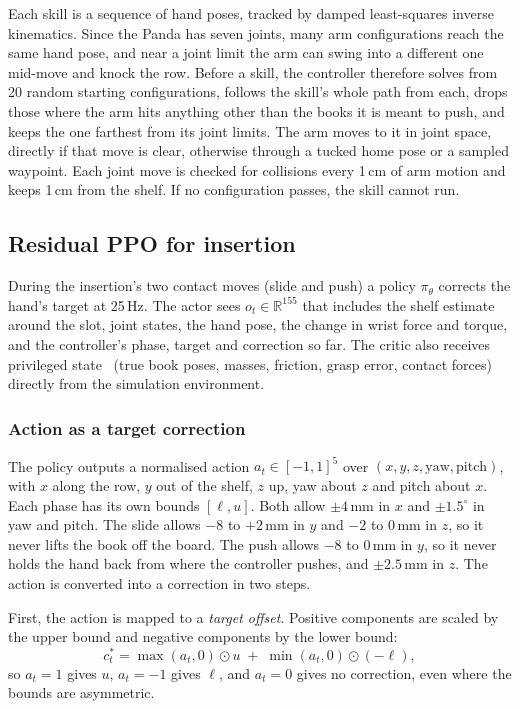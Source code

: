 \documentclass{article}
\begin{document}
Each skill is a sequence of hand poses, tracked by damped least-squares inverse kinematics. Since the Panda
has seven joints, many arm configurations reach the same hand pose, and near a joint limit the arm can swing
into a different one mid-move and knock the row. Before a skill, the controller therefore solves from 20
random starting configurations, follows the skill's whole path from each, drops those where the arm hits
anything other than the books it is meant to push, and keeps the one farthest from its joint limits. The arm
moves to it in joint space, directly if that move is clear, otherwise through a tucked home pose or a
sampled waypoint. Each joint move is checked for collisions every 1\,cm of arm motion and keeps 1\,cm from
the shelf. If no configuration passes, the skill cannot run.

\subsection{Residual PPO for insertion}
During the insertion's two contact moves (slide and push) a policy $\pi_\theta$ corrects the hand's target at
25\,Hz. The actor sees $o_t \in \mathbb{R}^{155}$ that includes the shelf estimate around the slot, joint states, the hand pose, the change in wrist force and torque, and the controller's
phase, target and correction so far. The critic also receives privileged state~\citep{pinto2018asymmetric}
(true book poses, masses, friction, grasp error, contact forces) directly from the simulation environment.

\subsubsection{Action as a target correction}
The policy outputs a normalised action $a_t \in [-1,1]^5$ over
$(x, y, z, \text{yaw}, \text{pitch})$, with $x$ along the row, $y$ out of the shelf, $z$ up, yaw about $z$
and pitch about $x$. Each phase has its own bounds $[\ell, u]$. Both allow $\pm 4$\,mm in $x$ and
$\pm 1.5^\circ$ in yaw and pitch. The slide allows $-8$ to $+2$\,mm in $y$ and $-2$ to $0$\,mm in $z$, so it
never lifts the book off the board. The push allows $-8$ to $0$\,mm in $y$, so it never holds the hand back
from where the controller pushes, and $\pm 2.5$\,mm in $z$. The action is converted into a correction in
two steps.

First, the action is mapped to a \emph{target offset}. Positive components
are scaled by the upper bound and negative components by the lower bound:
\begin{equation}
  c^\ast_t = \max(a_t, 0) \odot u \;+\; \min(a_t, 0) \odot (-\ell),
  \label{eq:target}
\end{equation}
so $a_t = 1$ gives $u$, $a_t = -1$ gives $\ell$, and $a_t = 0$ gives no
correction, even where the bounds are asymmetric.
\end{document}

